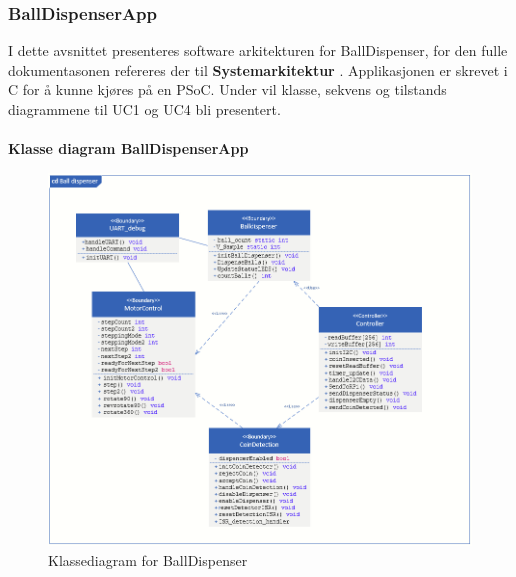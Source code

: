 \documentclass[Rapport/Rapport_main.tex]{subfiles}
\begin{document}
\subsubsection{BallDispenserApp}
I dette avsnittet presenteres software arkitekturen for BallDispenser, for den fulle dokumentasonen refereres der til \textbf{Systemarkitektur} . Applikasjonen er skrevet i C for å kunne kjøres på en PSoC. Under vil klasse, sekvens og tilstands diagrammene til UC1 og UC4 bli presentert.\\\\
\textbf{Klasse diagram BallDispenserApp}\\
\begin{figure}[H]
    \centering
    \includegraphics[width=\textwidth]{Rapport/Arkitektur/graphics/CDBolddispenser.png}
    \caption{Klassediagram for BallDispenser}
    \label{fig:BallDipKlasse}
\end{figure}
\end{document}

